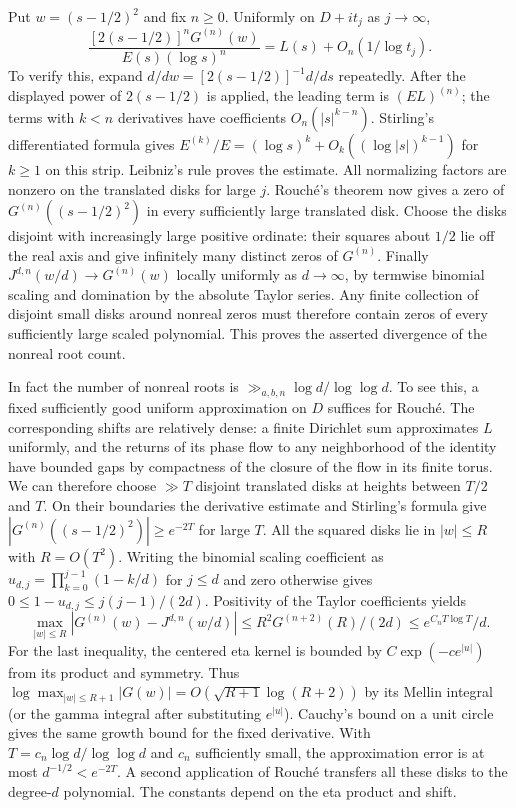 Put $w=(s-1/2)^2$ and fix $n\ge0$. Uniformly on $D+it_j$ as $j\to\infty$,
\[
 \frac{[2(s-1/2)]^n G^{(n)}(w)}{E(s)(\log s)^n}
 =L(s)+O_n(1/\log t_j).
\]
To verify this, expand $d/dw=[2(s-1/2)]^{-1}d/ds$ repeatedly.
After the displayed power of $2(s-1/2)$ is applied, the leading term
is $(E L)^{(n)}$; the terms with $k<n$ derivatives have coefficients
$O_n(|s|^{k-n})$. Stirling's differentiated formula gives
$E^{(k)}/E=(\log s)^k+O_k((\log|s|)^{k-1})$ for $k\ge1$ on this strip.
Leibniz's rule proves the estimate. All normalizing factors are nonzero
on the translated disks for large $j$.
Rouch\'e's theorem now gives a zero of $G^{(n)}((s-1/2)^2)$ in every
sufficiently large translated disk. Choose the disks disjoint with increasingly
large positive ordinate: their squares about $1/2$ lie off the real axis and
give infinitely many distinct zeros of $G^{(n)}$.
Finally $J^{d,n}(w/d)\to G^{(n)}(w)$ locally uniformly as $d\to\infty$,
by termwise binomial scaling and domination by the absolute Taylor series.
Any finite collection of disjoint small disks around nonreal zeros must
therefore contain zeros of every sufficiently large scaled polynomial.
This proves the asserted divergence of the nonreal root count.

In fact the number of nonreal roots is $\gg_{a,b,n}\log d/\log\log d$.
To see this, a fixed sufficiently good uniform approximation on $D$ suffices
for Rouch\'e. The corresponding shifts are relatively dense: a finite
Dirichlet sum approximates $L$ uniformly, and the returns of its phase flow
to any neighborhood of the identity have bounded gaps by compactness
of the closure of the flow in its finite torus.
We can therefore choose $\gg T$ disjoint translated disks at heights
between $T/2$ and $T$. On their boundaries the derivative estimate and
Stirling's formula give $|G^{(n)}((s-1/2)^2)|\ge e^{-2T}$ for large $T$.
All the squared disks lie in $|w|\le R$ with $R=O(T^2)$.
Writing the binomial scaling coefficient as
$u_{d,j}=\prod_{k=0}^{j-1}(1-k/d)$ for $j\le d$ and zero otherwise gives
$0\le1-u_{d,j}\le j(j-1)/(2d)$. Positivity of the Taylor coefficients yields
\[
 \max_{|w|\le R}|G^{(n)}(w)-J^{d,n}(w/d)|
 \le R^2G^{(n+2)}(R)/(2d)\le e^{C_nT\log T}/d .
\]
For the last inequality, the centered eta kernel is bounded by
$C\exp(-c e^{|u|})$ from its product and symmetry. Thus
$\log\max_{|w|\le R+1}|G(w)|=O(\sqrt{R+1}\log(R+2))$ by its
Mellin integral (or the gamma integral after substituting $e^{|u|}$).
Cauchy's bound on a unit circle gives the same growth bound for the
fixed derivative. With $T=c_n\log d/\log\log d$ and $c_n$ sufficiently
small, the approximation error is at most $d^{-1/2}<e^{-2T}$.
A second application of Rouch\'e transfers all these disks to the
degree-$d$ polynomial. The constants depend on the eta product and shift.
